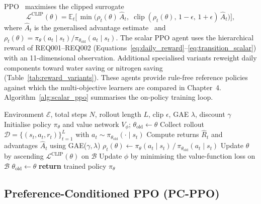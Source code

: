 PPO~\cite{schulman2017ppo} maximises the clipped surrogate
\begin{equation}
\mathcal{L}^{\text{CLIP}}(\theta) =
\mathbb{E}_t\!\Big[\, \min\big( \rho_t(\theta)\,\hat{A}_t,\;
\operatorname{clip}(\rho_t(\theta),\,1-\epsilon,\,1+\epsilon)\,\hat{A}_t \big) \Big],
\label{eq:ppoclip}
\end{equation}
where $\hat{A}_t$ is the generalised advantage estimate~\cite{schulman2016gae}
and $\rho_t(\theta)=\pi_\theta(a_t\mid s_t)/\pi_{\theta_{\text{old}}}(a_t\mid s_t)$.
The scalar PPO agent uses the hierarchical reward of
REQ001--REQ002 (Equations~\eqref{eq:daily_reward}--\eqref{eq:transition_scalar}) with an
11-dimensional observation. Additional specialised variants reweight daily
components toward water saving or nitrogen saving (Table~\ref{tab:reward_variants}).
These agents provide rule-free reference policies against which the
multi-objective learners are compared in Chapter~4.
Algorithm~\ref{alg:scalar_ppo} summarises the on-policy training loop.

\begin{algorithm}[ht]
\caption{Scalar PPO training on \texttt{SmartFarmSoSEnv}}
\label{alg:scalar_ppo}
\begin{algorithmic}[1]
\Require Environment $\mathcal{E}$, total steps $N$, rollout length $L$, clip $\epsilon$, GAE $\lambda$, discount $\gamma$
\State Initialise policy $\pi_\theta$ and value network $V_\phi$; $\theta_{\text{old}} \leftarrow \theta$
  \State Collect rollout $\mathcal{D}=\{(s_t,a_t,r_t)\}_{t=1}^{L}$ with $a_t \sim \pi_{\theta_{\text{old}}}(\cdot \mid s_t)$
  \State Compute returns $\hat{R}_t$ and advantages $\hat{A}_t$ using GAE($\gamma,\lambda$)
      \State $\rho_t(\theta) \leftarrow \pi_\theta(a_t \mid s_t)\,/\,\pi_{\theta_{\text{old}}}(a_t \mid s_t)$
      \State Update $\theta$ by ascending $\mathcal{L}^{\text{CLIP}}(\theta)$ on $\mathcal{B}$
      \State Update $\phi$ by minimising the value-function loss on $\mathcal{B}$
    \EndFor
  \EndFor
  \State $\theta_{\text{old}} \leftarrow \theta$
\EndWhile
\State \textbf{return} trained policy $\pi_\theta$
\end{algorithmic}
\end{algorithm}


\subsection{Preference-Conditioned PPO (PC-PPO)}
\label{subsec:pcppo}

